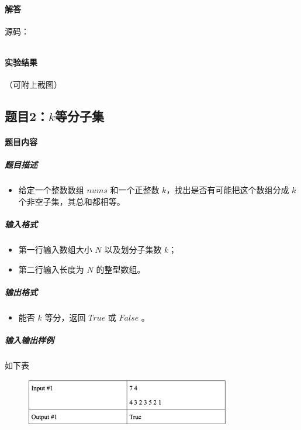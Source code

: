 \documentclass[12pt,a4paper]{ctexart}
\begin{document}
\vspace{5pt}

\paragraph{解答}

源码：
\inputminted[bgcolor=codebg,frame=lines,autogobble,linenos=true,breaklines]{cpp}{src/a.cpp}

\vspace{5pt}

\paragraph{实验结果}
（可附上截图）

\newpage

\subsection*{题目2：$k$等分子集}
\paragraph{题目内容}
\subparagraph{题目描述}
\begin{itemize}
    \item 给定一个整数数组 $nums$ 和一个正整数 $k$，找出是否有可能把这个数组分成 $k$ 个非空子集，其总和都相等。
\end{itemize}

\subparagraph{输入格式}
    \begin{itemize}
        \item 第一行输入数组大小 $N$ 以及划分子集数 $k$；
        \item 第二行输入长度为 $N$ 的整型数组。
    \end{itemize}

\subparagraph{输出格式}
    \begin{itemize}
        \item 能否 $k$ 等分，返回 $True$ 或 $False$ 。
    \end{itemize}
    
\subparagraph{输入输出样例}
如下表
    \begin{figure}[h]
        \centering
        \includegraphics[width=0.80\textwidth]{q2_iodata.png}
    \end{figure}
\end{document}
